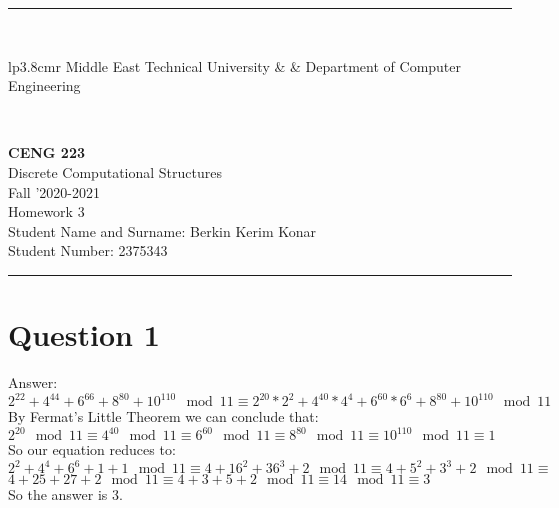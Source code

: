 \documentclass[12pt]{article}
\newcommand{\HRule}{\rule{\linewidth}{1mm}}
\begin{document}
\noindent
\HRule \\[3mm]
\small
\begin{tabular}[b]{lp{3.8cm}r}
{} Middle East Technical University &  &
{} Department of Computer Engineering \\
\end{tabular} \\
\begin{center}

                 \LARGE \textbf{CENG 223} \\[4mm]
                 \Large Discrete Computational Structures \\[4mm]
                \normalsize Fall '2020-2021 \\
                    \Large Homework 3 \\
                \normalsize Student Name and Surname: Berkin Kerim Konar  \\
                \normalsize Student Number:  2375343\\
\end{center}
\HRule


\section*{Question 1}

Answer:\\
   
    $2^{22} + 4^{44} + 6^{66} + 8^{80} + 10^{110} \mod 11 \equiv 2^{20}*2^2 + 4^{40}*4^4 + 6^{60}*6^6 + 8^{80} + 10^{110} \mod 11$\\
    
    By Fermat's Little Theorem we can conclude that:\\
    
    $2^{20} \mod 11 \equiv 4^{40} \mod 11 \equiv 6^{60} \mod 11 \equiv 8^{80} \mod 11 \equiv 10^{110} \mod 11 \equiv 1$\\
    
    So our equation reduces to:\\
    
    $2^2 + 4^4 + 6^6 + 1 + 1 \mod 11 \equiv 4 + 16^2 + 36^3 + 2 \mod 11 \equiv 4+5^2 + 3^3 + 2 \mod 11 \equiv$\\
   
    $4 + 25 + 27 + 2 \mod 11 \equiv 4 + 3 + 5 + 2 \mod 11 \equiv 14 \mod 11 \equiv 3$\\
    
    So the answer is 3.\\
\end{document}
